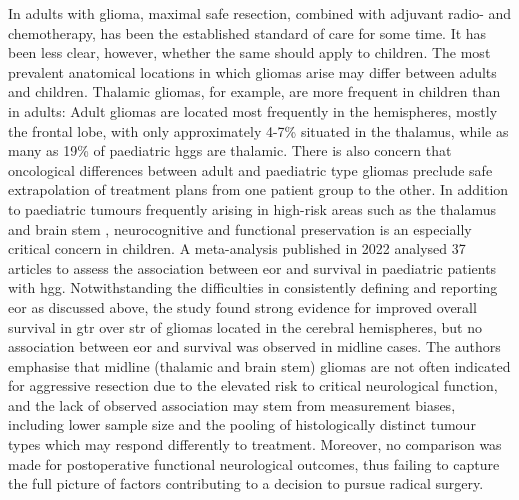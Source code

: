 In adults with glioma, maximal safe resection, combined with adjuvant radio- and chemotherapy, has been the established standard of care for some time.
It has been less clear, however, whether the same should apply to children.
The most prevalent anatomical locations in which gliomas arise may differ between adults and children\autocite{Duffau2004}.
Thalamic gliomas, for example, are more frequent in children than in adults\autocite{Cinalli2018,Palmisciano2021,GomezVecchio2021}:
Adult gliomas are located most frequently in the hemispheres, mostly the frontal lobe, with only approximately 4-7\%\autocite{GomezVecchio2021,Larjavaara2007} situated in the thalamus, while as many as 19\% of paediatric \glspl{hgg} are thalamic\autocite{McCrea2015}.
There is also concern that oncological differences between adult and paediatric type gliomas preclude safe extrapolation of treatment plans from one patient group to the other\autocite{Jones2012,Greuter2021}.
In addition to paediatric tumours frequently arising in high-risk areas such as the thalamus and brain stem \autocite{Ostrom2015},  neurocognitive and functional preservation is an especially critical concern in children.
A meta-analysis published in 2022 analysed 37 articles to assess the association between \gls{eor} and survival in paediatric patients with \gls{hgg}\autocite{Hatoum2022}.
Notwithstanding the difficulties in consistently defining and reporting \gls{eor} as discussed above, the study found strong evidence for improved overall survival in \gls{gtr} over \gls{str} of gliomas located in the cerebral hemispheres, but no association between \gls{eor} and survival was observed in midline cases.
The authors emphasise that midline (thalamic and brain stem) gliomas are not often indicated for aggressive resection due to the elevated risk to critical neurological function, and the lack of observed association may stem from measurement biases, including lower sample size and the pooling of histologically distinct tumour types which may respond differently to treatment.
Moreover, no comparison was made for postoperative functional neurological outcomes, thus failing to capture the full picture of factors contributing to a decision to pursue radical surgery.

